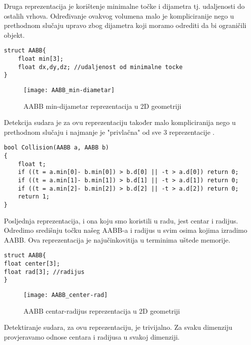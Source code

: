 Druga reprezentacija je korištenje minimalne točke i dijametra tj. udaljenosti do ostalih vrhova. Određivanje ovakvog volumena malo je kompliciranije nego u prethodnom slučaju upravo zbog dijametra koji moramo odrediti da bi ograničili objekt.

\begin{lstlisting}[style={myC++},label={code:3}, caption = {Struktura AABB-a koji koristi min točku i dijametar}]
struct AABB{
	float min[3];
	float dx,dy,dz; //udaljenost od minimalne tocke
}
\end{lstlisting}
 
 \begin{figure}[!http]
 	\begin{center}
 		\texttt{[image: AABB\_min-diametar]}
 		\caption{AABB min-dijametar reprezentacija u 2D geometriji}
 		\label{fig:4}
 	\end{center}
 \end{figure}


Detekcija sudara je za ovu reprezentaciju također malo kompliciranija nego u prethodnom slučaju i najmanje je "privlačna" od sve 3 reprezentacije \cite{1}.


\begin{lstlisting}[style = {myC++},label={code:4}, caption = {Provjeravanje sudara za min-width reprezentaciju AABB-a\cite{1}}]
bool Collision(AABB a, AABB b)
{
	float t;
	if ((t = a.min[0]- b.min[0]) > b.d[0] || -t > a.d[0]) return 0;
	if ((t = a.min[1]- b.min[1]) > b.d[1] || -t > a.d[1]) return 0;
	if ((t = a.min[2]- b.min[2]) > b.d[2] || -t > a.d[2]) return 0;
	return 1;
}
\end{lstlisting}

Posljednja reprezentacija, i ona koju smo koristili u radu, jest centar i radijus. Odredimo središnju točku našeg AABB-a i radijus u svim osima kojima izradimo AABB. Ova reprezentacija je najučinkovitija u terminima uštede memorije\cite{1}. 

\begin{lstlisting}[style = {myC++},label={code:5}, caption = {Struktura AABB-a koji koristi centar i radijus}]
struct AABB{
float center[3];
float rad[3]; //radijus
}
\end{lstlisting}

 \begin{figure}[!http]
 	\begin{center}
 		\texttt{[image: AABB\_center-rad]}
 		\caption{AABB centar-radijus reprezentacija u 2D geometriji}
 		\label{fig:5}
 	\end{center}
 \end{figure}
 \newpage
 Detektiranje sudara, za ovu reprezentaciju, je trivijalno. Za svaku dimenziju provjeravamo odnose centara i radijusa u svakoj dimenziji.
 
